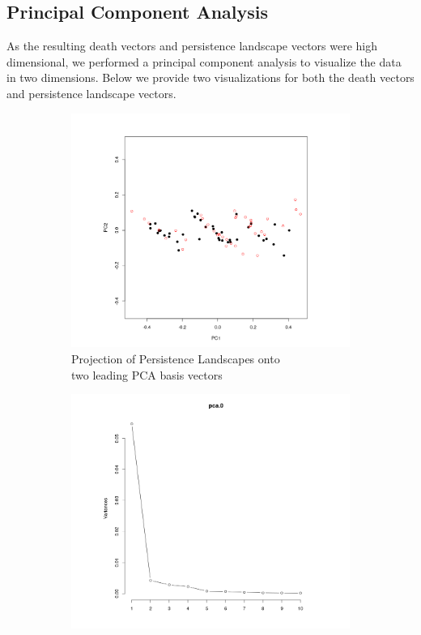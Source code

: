 \documentclass[11pt, reqno]{amsart}
\theoremstyle{plain}
\theoremstyle{definition}
\begin{document}

\subsection{Principal Component Analysis}

As the resulting death vectors and persistence landscape vectors were high dimensional, we performed a principal component analysis to visualize the data in two dimensions. Below we provide two visualizations for both the death vectors and persistence landscape vectors. 
\begin{figure}[H]
\centering
\begin{subfigure}{.5\textwidth}
  \centering
  \includegraphics[width=0.9\linewidth]{nv_mel_DV_PCA_Points_Plot.png}
  \caption{Projection of Persistence Landscapes onto\\two leading PCA basis vectors}
\end{subfigure}%
\begin{subfigure}{.5\textwidth}
  \centering
  \includegraphics[width=0.9\linewidth]{nv_mel_DV_PCA_Vietoris_Rips.png}

\end{subfigure}
\end{figure}
\end{document}
